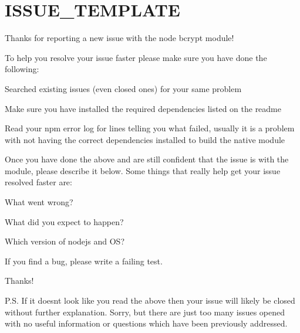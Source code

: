\chapter{ISSUE\+\_\+\+TEMPLATE}
\hypertarget{md_node__modules_2bcrypt_2_i_s_s_u_e___t_e_m_p_l_a_t_e}{}\label{md_node__modules_2bcrypt_2_i_s_s_u_e___t_e_m_p_l_a_t_e}
Thanks for reporting a new issue with the node bcrypt module!

To help you resolve your issue faster please make sure you have done the following\+:


\begin{DoxyItemize}
\item Searched existing issues (even closed ones) for your same problem
\item Make sure you have installed the required dependencies listed on the readme
\item Read your npm error log for lines telling you what failed, usually it is a problem with not having the correct dependencies installed to build the native module
\end{DoxyItemize}

Once you have done the above and are still confident that the issue is with the module, please describe it below. Some things that really help get your issue resolved faster are\+:


\begin{DoxyItemize}
\item What went wrong?
\item What did you expect to happen?
\item Which version of nodejs and OS?
\item If you find a bug, please write a failing test.
\end{DoxyItemize}

Thanks!

P.\+S. If it doesn\textquotesingle{}t look like you read the above then your issue will likely be closed without further explanation. Sorry, but there are just too many issues opened with no useful information or questions which have been previously addressed. 